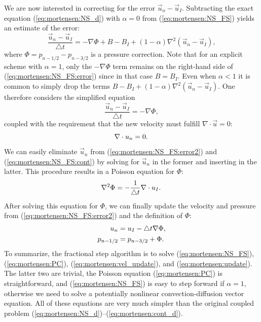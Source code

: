 We are now interested in correcting for the error $\vec{u}_n-\vec{u}_I$.
Subtracting the exact equation (\eqref{eq:mortensen:NS_d}) with
$\alpha = 0$ from
(\eqref{eq:mortensen:NS_FS}) yields an estimate of the error:
\begin{equation}
\label{eq:mortensen:NS_FS:error}
\frac{{\vec{u}}_{n}-\vec{u}_{I}}{\triangle t} = 
-\nabla\Phi + B - B_I + (1-\alpha )\nabla^2(\vec{u}_n-\vec{u}_I),
\end{equation}
where $\Phi = p_{n-1/2} - p_{n-3/2} $ is a pressure correction.
Note that for an explicit scheme with $\alpha = 1$, only the
$-\nabla\Phi$ term remains on the right-hand side of (\eqref{eq:mortensen:NS_FS:error})
since in that case $B=B_I$. Even when $\alpha < 1$ it is common to simply drop
the terms $B - B_I + (1-\alpha)\nabla^2(\vec{u}_n-\vec{u}_I)$.
One therefore considers the simplified equation
\begin{equation}
\label{eq:mortensen:NS_FS:error2}
\frac{{\vec{u}}_{n}-\vec{u}_{I}}{\triangle t} = 
-\nabla\Phi,
\end{equation}
coupled with the requirement that the new velocity must fulfill
$\nabla\cdot\vec{u}=0$:
\begin{equation}
 \label{eq:mortensen:NS_FS:cont} \nabla \cdot \vec{u}_{n} =0 . \thinspace
\end{equation}
We can easily eliminate $\vec{u}_{n}$ from (\eqref{eq:mortensen:NS_FS:error2})
and (\eqref{eq:mortensen:NS_FS:cont}) by solving for $\vec{u}_{n}$ in the former
and inserting in the latter. This procedure results in a 
Poisson equation for $\Phi$:
\begin{equation}
 \label{eq:mortensen:PC} \nabla^2 \Phi = -\frac{1}{\triangle t} \nabla \cdot {\vec{u}}_{I} . \thinspace
\end{equation}
After solving this equation for $\Phi$, we can
finally update the velocity and pressure from (\eqref{eq:mortensen:NS_FS:error2})
and the definition of $\Phi$:
\begin{align}
 \label{eq:mortensen:vel_update} \vec{u}_{n} &= {\vec{u}}_{I} - \triangle t \nabla \Phi, \\
  p_{n-1/2} &= p_{n-3/2} + \Phi . \thinspace
\label{eq:mortensen:update}
\end{align}
To summarize, the fractional step algorithm is to solve
(\eqref{eq:mortensen:NS_FS}), (\eqref{eq:mortensen:PC}), (\eqref{eq:mortensen:vel_update}), and
(\eqref{eq:mortensen:update}). The latter two are trivial, the Poisson
equation (\eqref{eq:mortensen:PC}) is straightforward, and (\eqref{eq:mortensen:NS_FS})
is easy to step forward if $\alpha=1$, otherwise we need to solve
a potentially nonlinear convection-diffusion vector equation.
All of these equations are very much simpler than the
original coupled problem (\eqref{eq:mortensen:NS_d})--(\eqref{eq:mortensen:cont_d}).

